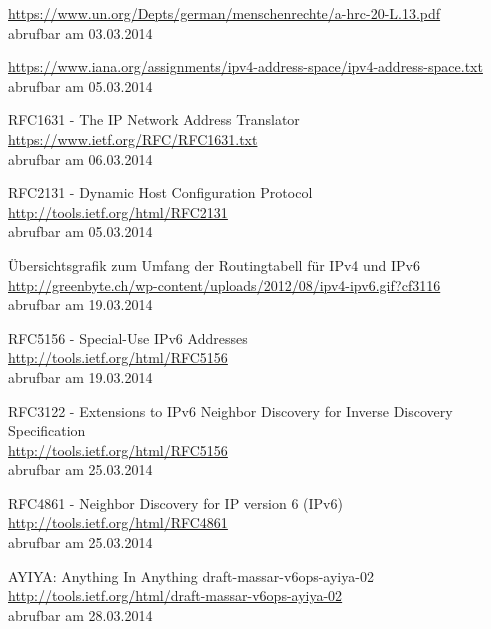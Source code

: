 \documentclass[a4paper,12pt]{scrartcl}
\begin{document}
\renewcommand\refname{Quellenverzeichnis}
\begin{thebibliography}{999}

\url{https://www.un.org/Depts/german/menschenrechte/a-hrc-20-L.13.pdf}\\
abrufbar am 03.03.2014

 \url{https://www.iana.org/assignments/ipv4-address-space/ipv4-address-space.txt}\\
abrufbar am 05.03.2014

 RFC1631 - The IP Network Address Translator\\
\url{https://www.ietf.org/RFC/RFC1631.txt}\\
abrufbar am 06.03.2014

 RFC2131 - Dynamic Host Configuration Protocol\\
\url{http://tools.ietf.org/html/RFC2131}\\
abrufbar am 05.03.2014

 \"Ubersichtsgrafik zum Umfang der Routingtabell f\"ur IPv4 und IPv6\\
\url{http://greenbyte.ch/wp-content/uploads/2012/08/ipv4-ipv6.gif?cf3116}\\
abrufbar am 19.03.2014

 RFC5156 - Special-Use IPv6 Addresses \\
\url{http://tools.ietf.org/html/RFC5156}\\
abrufbar am 19.03.2014

 RFC3122 -  Extensions to IPv6 Neighbor Discovery for Inverse Discovery Specification\\
\url{http://tools.ietf.org/html/RFC5156}\\
abrufbar am 25.03.2014

 RFC4861 - Neighbor Discovery for IP version 6 (IPv6) \\
\url{http://tools.ietf.org/html/RFC4861}\\
abrufbar am 25.03.2014

 AYIYA: Anything In Anything draft-massar-v6ops-ayiya-02\\
\url{http://tools.ietf.org/html/draft-massar-v6ops-ayiya-02}\\
abrufbar am 28.03.2014

\end{thebibliography}
 
 
\end{document}
